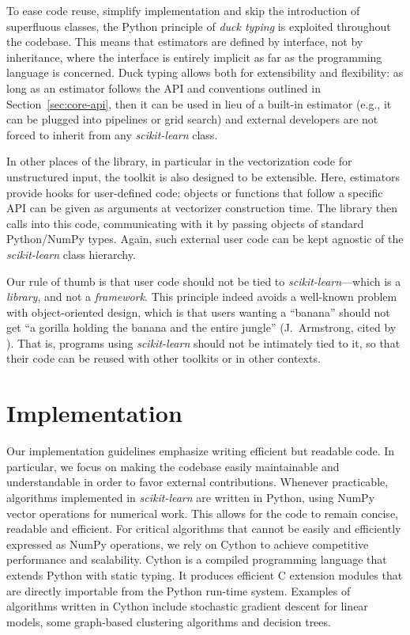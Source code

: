 \documentclass{llncs}
\newcommand{\sklearn}{\textit{scikit-learn}\xspace}
\begin{document}
To ease code reuse, simplify implementation and skip the introduction of
superfluous classes, the Python principle of \textit{duck typing} is exploited
throughout the codebase. This means that estimators are defined by interface,
not by inheritance, where the interface is entirely implicit
as far as the programming language is concerned.
Duck typing allows both for extensibility and
flexibility: as long as an estimator follows the API and conventions
outlined in Section~\ref{sec:core-api}, then it can be used in lieu of a
built-in estimator (e.g., it can be plugged into pipelines or grid search)
and external developers are not forced to inherit from any \sklearn class.

In other places of the library, in particular in the vectorization code
for unstructured input, the toolkit is also designed to be
extensible. Here, estimators provide hooks for user-defined code: objects or
functions that follow a specific API can be given as arguments at vectorizer
construction time. The library then calls into this code, communicating with it by passing objects of standard Python/NumPy types.
Again, such external user code can be kept agnostic of the \sklearn
class hierarchy.

Our rule of thumb is that user code should not be tied to \sklearn---which is a
\textit{library}, and not a \textit{framework}. This principle indeed avoids a
well-known problem with object-oriented design, which is that users wanting a
``banana'' should not get ``a gorilla holding the banana and the entire jungle''
(J.~Armstrong, cited by \citealp[p.~213]{seibel2009coders}).
That is, programs using \sklearn should not be intimately tied to it,
so that their code can be reused with other toolkits or in other contexts.


\section{Implementation}
\label{sec:implementation}

Our implementation guidelines emphasize writing efficient but readable code.
In particular, we focus on making the codebase easily maintainable and
understandable in order to favor external contributions. Whenever practicable,
algorithms implemented in \sklearn are written in Python,
using NumPy vector operations for numerical work.
This allows for the code to remain concise, readable and
efficient. For critical algorithms that cannot be easily and efficiently
expressed as NumPy operations, we rely on Cython \citep{behnel2011cython}
to achieve competitive performance and scalability. Cython is a
compiled programming language that extends Python with static typing. It
produces efficient C extension modules that are directly importable from the
Python run-time system. Examples of algorithms written in Cython include
stochastic gradient descent for linear models, some graph-based clustering
algorithms and decision trees.
\end{document}
